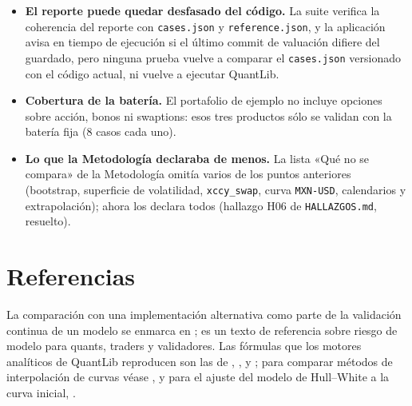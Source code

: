 \begin{limites}
\begin{itemize}
      Bajó a $10^{-6}$, la de los demás productos de tasas, y el reporte regenerado sigue en $62$ dentro, $0$
      explicados y $0$ fuera; la Metodología declara el nuevo valor (hallazgo H05 de \texttt{HALLAZGOS.md}, resuelto).
    \item \textbf{El reporte puede quedar desfasado del código.} La suite verifica la coherencia del reporte con
      \texttt{cases.json} y \texttt{reference.json}, y la aplicación avisa en tiempo de ejecución si el último commit de
      valuación difiere del guardado, pero ninguna prueba vuelve a comparar el \texttt{cases.json} versionado con el
      código actual, ni vuelve a ejecutar QuantLib.
    \item \textbf{Cobertura de la batería.} El portafolio de ejemplo no incluye opciones sobre acción, bonos ni swaptions:
      esos tres productos sólo se validan con la batería fija ($8$ casos cada uno).
    \item \textbf{Lo que la Metodología declaraba de menos.} La lista «Qué no se compara» de la Metodología omitía varios
      de los puntos anteriores (bootstrap, superficie de volatilidad, \texttt{xccy\_swap}, curva \texttt{MXN-USD},
      calendarios y extrapolación); ahora los declara todos (hallazgo H06 de \texttt{HALLAZGOS.md}, resuelto).
  \end{itemize}
\end{limites}

\section{Referencias}\label{sec:cap12-referencias}

La comparación con una implementación alternativa como parte de la validación continua de un modelo se enmarca en
\citet{fed2011}; \citet{morini2011} es un texto de referencia sobre riesgo de modelo para quants, traders y validadores. Las
fórmulas que los motores analíticos de QuantLib reproducen son las de \citet{garman1983}, \citet{black1973},
\citet{hull1990} y \citet{jamshidian1989}; para comparar métodos de interpolación de curvas véase \citet{hagan2006}, y
para el ajuste del modelo de Hull--White a la curva inicial, \citet{brigo2006}.
